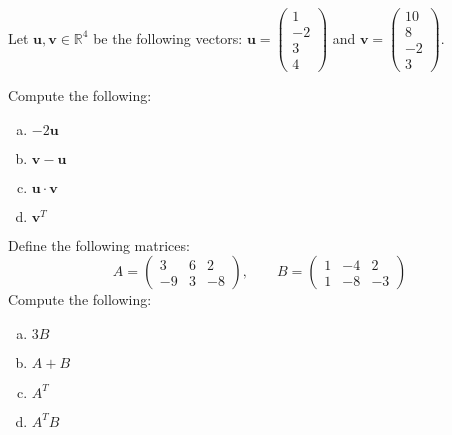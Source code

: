 \documentclass[11pt,letterpaper]{article}
\begin{document}

 Let $\mathbf{u}, \mathbf{v} \in \mathbb{R}^4$ be the following vectors: $\mathbf{u}= \begin{pmatrix} 1 \\ -2 \\ 3 \\ 4 \end{pmatrix}$ and $\mathbf{v}= \begin{pmatrix} 10 \\ 8 \\ -2 \\ 3 \end{pmatrix}$. \par Compute the following:
	\begin{enumerate}[(a)]
	\item $-2\mathbf{u}$
	\item $\mathbf{v} - \mathbf{u}$
	\item $\mathbf{u} \cdot \mathbf{v}$
	\item $\mathbf{v}^T$
	\end{enumerate}



\newpage



 Define the following matrices:
	\[
	A= \begin{pmatrix} 3 & 6 & 2 \\ -9 & 3 & -8 \end{pmatrix}, \qquad B= \begin{pmatrix} 1 & -4 & 2 \\ 1 & -8 & -3 \end{pmatrix}
	\]
Compute the following:
	\begin{enumerate}[(a)]
	\item $3B$
	\item $A + B$
	\item $A^T$
	\item $A^TB$
	\end{enumerate}



\newpage
\end{document}

